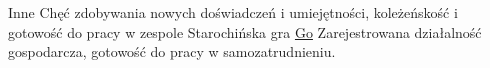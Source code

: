\begin{rubric}{Inne}
Chęć zdobywania nowych doświadczeń i umiejętności, koleżeńskość i gotowość do pracy w zespole
\entry*[Hobby]
Starochińska gra \href{http://go.art.pl/}{Go}
Zarejestrowana działalność gospodarcza, gotowość do pracy w samozatrudnieniu.
\end{rubric}

